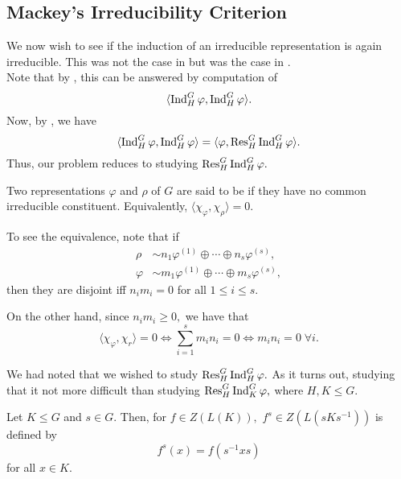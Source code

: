 \subsection{Mackey's Irreducibility Criterion}
We now wish to see if the induction of an irreducible representation is again irreducible. This was not the case in  but was the case in . \\
Note that by , this can be answered by computation of
\begin{equation*} 
	\langle \operatorname{Ind}^{G}_{H}\varphi, \operatorname{Ind}^{G}_{H}\varphi\rangle.
\end{equation*}
Now, by , we have
\begin{equation*} 
	\langle \operatorname{Ind}^{G}_{H}\varphi, \operatorname{Ind}^{G}_{H}\varphi\rangle = \langle \varphi, \operatorname{Res}^{G}_{H}\operatorname{Ind}^{G}_{H}\varphi\rangle.
\end{equation*}
Thus, our problem reduces to studying $\operatorname{Res}^{G}_{H}\operatorname{Ind}^{G}_{H}\varphi.$

\begin{defn}%
	Two representations $\varphi$ and $\rho$ of $G$ are said to be  if they have no common irreducible constituent. Equivalently, $\langle \chi_\varphi, \chi_\rho\rangle = 0.$
\end{defn}

\begin{rem}
	To see the equivalence, note that if
	\begin{align*} 
		\rho &\sim n_1\varphi^{(1)} \oplus \cdots \oplus n_s\varphi^{(s)},\\
		\varphi &\sim m_1\varphi^{(1)} \oplus \cdots \oplus m_s\varphi^{(s)},
	\end{align*}
	then they are disjoint iff $n_im_i = 0$ for all $1 \le i \le s.$

	On the other hand, since $n_im_i \ge 0,$ we have that
	\begin{equation*} 
		\langle \chi_\varphi, \chi_r\rangle = 0 \iff \sum_{i = 1}^{s}m_in_i = 0 \iff m_in_i = 0 \; \forall i.
	\end{equation*}
\end{rem}

We had noted that we wished to study $\operatorname{Res}^{G}_{H}\operatorname{Ind}^{G}_{H}\varphi.$ As it turns out, studying that it not more difficult than studying $\operatorname{Res}^{G}_{H}\operatorname{Ind}^{G}_{K}\varphi,$ where $H, K \le G.$ 

\begin{defn}
	Let $K \le G$ and $s \in G.$ Then, for $f \in Z(L(K)),$ $f^s \in Z(L(sKs^{-1}))$ is defined by
	\begin{equation*} 
		f^s(x) = f(s^{-1}xs)
	\end{equation*}
	for all $x \in K.$
\end{defn}

